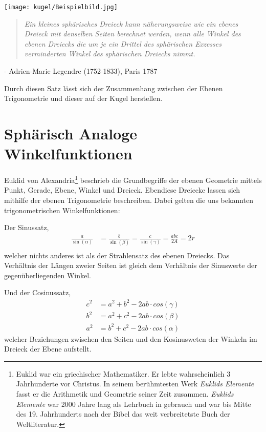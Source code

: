 \begin{refsection}
\begin{center}
        \texttt{[image: kugel/Beispielbild.jpg]}
\end{center}

\begin{quote} \textit{Ein kleines sphärisches Dreieck kann näherungsweise 
wie ein ebenes Dreieck mit denselben Seiten berechnet 
werden, wenn alle Winkel des ebenen Dreiecks die um 
je ein Drittel des sphärischen Exzesses verminderten 
Winkel des sphärischen Dreiecks nimmt.} \end{quote}
\begin{flushright} - Adrien-Marie Legendre (1752-1833), Paris 1787
\end{flushright}

Durch diesen Satz lässt sich der Zusammenhang zwischen der Ebenen Trigonometrie und dieser auf der Kugel herstellen.



\section{Sphärisch Analoge Winkelfunktionen}
Euklid von Alexandria\footnote{%
Euklid war ein griechischer Mathematiker. Er lebte wahrscheinlich 3 Jahrhunderte vor Christus. In seinem berühmtesten Werk \textit{Euklids Elemente} fasst er die Arithmetik und Geometrie seiner Zeit zusammen. \textit{Euklids Elemente} war 2000 Jahre lang als Lehrbuch in gebrauch und war bis Mitte des 19. Jahrhunderts nach der Bibel das weit verbreitetste Buch der Weltliteratur.}  beschrieb die Grundbegriffe der ebenen Geometrie mittels Punkt, Gerade, Ebene, Winkel und Dreieck. Ebendiese Dreiecke lassen sich mithilfe der ebenen Trigonometrie beschreiben. Dabei gelten die uns bekannten trigonometrischen Winkelfunktionen:

Der Sinussatz,
\begin{align*}
\frac{ a }{\sin(\alpha) } &= \frac{ b }{\sin(\beta)} = \frac{ c }{\sin(\gamma) } = \frac{abc}{2A} = 2r\\
\end{align*}
welcher nichts anderes ist als der Strahlensatz des ebenen Dreiecks. Das Verhältnis der Längen zweier Seiten ist gleich dem Verhältnis der Sinuswerte der gegenüberliegenden Winkel.

Und der Cosinussatz,
\begin{align*}
c^{ 2 } &= a^{ 2 } + b^{ 2 } - 2ab\cdot cos(\gamma)\\
b^{ 2 } &= a^{ 2 } + c^{ 2 } - 2ab\cdot cos(\beta)\\
a^{ 2 } &= b^{ 2 } + c^{ 2 } - 2ab\cdot cos(\alpha)
\end{align*}
welcher Beziehungen zwischen den Seiten und den Kosinusweten der Winkeln im Dreieck der Ebene aufstellt.


\end{refsection}
